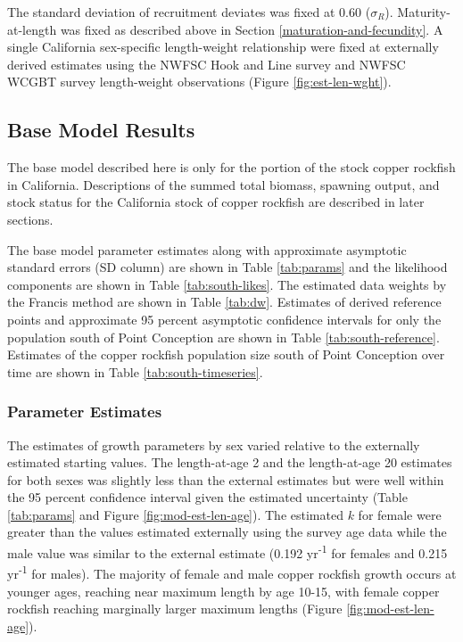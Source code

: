 \documentclass[11pt,
  english,
  letterpaper,
]{article}
\begin{document}
The standard deviation of recruitment deviates was fixed at 0.60 (\(\sigma_R\)). Maturity-at-length was fixed as described above in Section \ref{maturation-and-fecundity}. A single California sex-specific length-weight relationship were fixed at externally derived estimates using the NWFSC Hook and Line survey and NWFSC WCGBT survey length-weight observations (Figure \ref{fig:est-len-wght}).

\hypertarget{base-model-results}{%
\subsection{Base Model Results}\label{base-model-results}}

The base model described here is only for the portion of the stock copper rockfish in California. Descriptions of the summed total biomass, spawning output, and stock status for the California stock of copper rockfish are described in later sections.

The base model parameter estimates along with approximate asymptotic standard errors (SD column) are shown in Table \ref{tab:params} and the likelihood components are shown in Table \ref{tab:south-likes}. The estimated data weights by the Francis method are shown in Table \ref{tab:dw}. Estimates of derived reference points and approximate 95 percent asymptotic confidence intervals for only the population south of Point Conception are shown in Table \ref{tab:south-reference}. Estimates of the copper rockfish population size south of Point Conception over time are shown in Table \ref{tab:south-timeseries}.

\hypertarget{parameter-estimates}{%
\subsubsection{Parameter Estimates}\label{parameter-estimates}}

The estimates of growth parameters by sex varied relative to the externally estimated starting values. The length-at-age 2 and the length-at-age 20 estimates for both sexes was slightly less than the external estimates but were well within the 95 percent confidence interval given the estimated uncertainty (Table \ref{tab:params} and Figure \ref{fig:mod-est-len-age}). The estimated \(k\) for female were greater than the values estimated externally using the survey age data while the male value was similar to the external estimate (0.192 yr\textsuperscript{-1} for females and 0.215 yr\textsuperscript{-1} for males). The majority of female and male copper rockfish growth occurs at younger ages, reaching near maximum length by age 10-15, with female copper rockfish reaching marginally larger maximum lengths (Figure \ref{fig:mod-est-len-age}).
\end{document}

